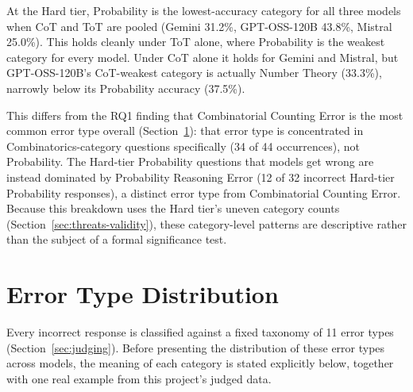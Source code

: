 At the Hard tier, Probability is the lowest-accuracy category for all
three models when CoT and ToT are pooled (Gemini 31.2\%, GPT-OSS-120B
43.8\%, Mistral 25.0\%). This holds cleanly under ToT alone, where
Probability is the weakest category for every model. Under CoT alone it
holds for Gemini and Mistral, but GPT-OSS-120B's CoT-weakest category is
actually Number Theory (33.3\%), narrowly below its Probability accuracy
(37.5\%).

This differs from the RQ1 finding that Combinatorial Counting Error is
the most common error type overall (Section~\ref{sec:rq1}): that error
type is concentrated in Combinatorics-category questions specifically
(34 of 44 occurrences), not Probability. The Hard-tier Probability
questions that models get wrong are instead dominated by Probability
Reasoning Error (12 of 32 incorrect Hard-tier Probability responses), a
distinct error type from Combinatorial Counting Error. Because this
breakdown uses the Hard tier's uneven category counts
(Section~\ref{sec:threats-validity}), these category-level patterns are
descriptive rather than the subject of a formal significance test.

\section{Error Type Distribution}
\label{sec:rq1}

Every incorrect response is classified against a fixed taxonomy of 11
error types (Section~\ref{sec:judging}). Before presenting the
distribution of these error types across models, the meaning of each
category is stated explicitly below, together with one real example from
this project's judged data.


